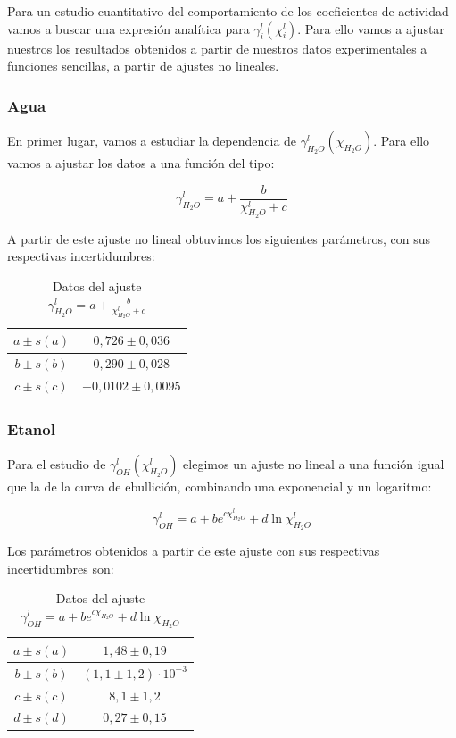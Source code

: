 \documentclass[a4paper,12pt,titlepage]{article}
\begin{document}
Para un estudio cuantitativo del comportamiento de los coeficientes de actividad vamos a buscar una expresión analítica para $\gamma_i^l(\chi_i^l)$. Para ello vamos a ajustar nuestros los resultados obtenidos a partir de nuestros datos experimentales a funciones sencillas, a partir de ajustes no lineales.

\subsubsection{Agua}

En primer lugar, vamos a estudiar la dependencia de $\gamma_{H_2O}^l(\chi_{H_2O})$. Para ello vamos a ajustar los datos a una función del tipo:

\begin{equation}
    \gamma_{H_2O}^l = a + \frac{b}{\chi_{H_2O}^l + c}
\end{equation}

A partir de este ajuste no lineal obtuvimos los siguientes parámetros, con sus respectivas incertidumbres:

\begin{table}[h!]
    \centering
    \begin{tabular}{|c|c|}
    \hline
    $a \pm s(a) $ &  $0,726 \pm 0,036$\\ \hline
    $b\pm s(b)$ & $0,290 \pm 0,028$ \\ \hline
    $c \pm s(c)$ & $-0,0102 \pm 0,0095$\\ \hline
    \end{tabular}
    \caption{Datos del ajuste $\gamma_{H_2O}^l = a + \frac{b}{\chi_{H_2O}^l + c}$}
    \label{tab:my_label}
\end{table}

\subsubsection{Etanol}

Para el estudio de $\gamma_{OH}^l(\chi_{H_2O}^l)$ elegimos un ajuste no lineal a una función igual que la de la curva de ebullición, combinando una exponencial y un logaritmo:

\begin{equation}
    \gamma_{OH}^l = a + be^{c\chi_{H_2O}^l} + d\ln \chi_{H_2O}^l
\end{equation}

Los parámetros obtenidos a partir de este ajuste con sus respectivas incertidumbres son:

\begin{table}[h!]
    \centering
    \begin{tabular}{|c|c|}
    \hline
    $a \pm s(a) $ &  $1,48 \pm 0,19$\\ \hline
    $b\pm s(b)$ & $(1,1 \pm 1,2) \cdot 10^{-3}$ \\ \hline
    $c \pm s(c)$ & $8,1 \pm 1,2$\\ \hline
    $d \pm s(d)$ & $0,27 \pm 0,15$ \\ \hline
    \end{tabular}
    \caption{Datos del ajuste $\gamma_{OH}^l=a + be^{c\chi_{H_2O}} + d\ln \chi_{H_2O}$}
    \label{tab:my_label}
\end{table}
\end{document}
